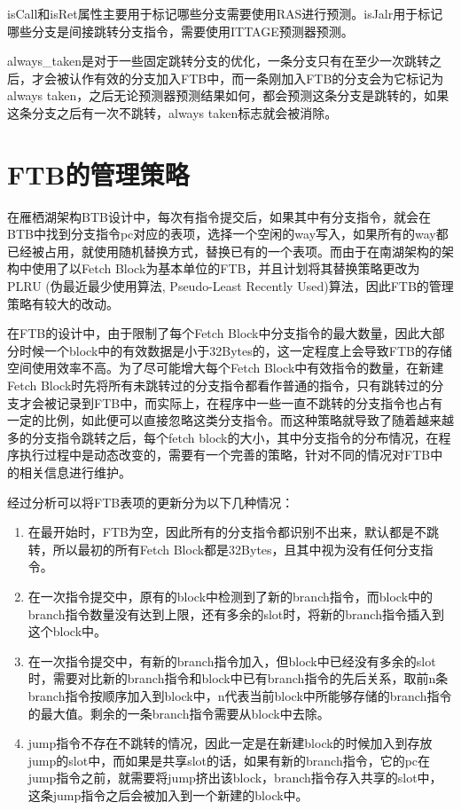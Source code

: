 isCall和isRet属性主要用于标记哪些分支需要使用RAS进行预测。isJalr用于标记哪些分支是间接跳转分支指令，需要使用ITTAGE预测器预测。

always\_taken是对于一些固定跳转分支的优化，一条分支只有在至少一次跳转之后，才会被认作有效的分支加入FTB中，而一条刚加入FTB的分支会为它标记为always taken，之后无论预测器预测结果如何，都会预测这条分支是跳转的，如果这条分支之后有一次不跳转，always taken标志就会被消除。

\section{FTB的管理策略}

在雁栖湖架构BTB设计中，每次有指令提交后，如果其中有分支指令，就会在BTB中找到分支指令pc对应的表项，选择一个空闲的way写入，如果所有的way都已经被占用，就使用随机替换方式，替换已有的一个表项。而由于在南湖架构的架构中使用了以Fetch Block为基本单位的FTB，并且计划将其替换策略更改为PLRU (伪最近最少使用算法, Pseudo-Least Recently Used)算法，因此FTB的管理策略有较大的改动。

在FTB的设计中，由于限制了每个Fetch Block中分支指令的最大数量，因此大部分时候一个block中的有效数据是小于32Bytes的，这一定程度上会导致FTB的存储空间使用效率不高。为了尽可能增大每个Fetch Block中有效指令的数量，在新建Fetch Block时先将所有未跳转过的分支指令都看作普通的指令，只有跳转过的分支才会被记录到FTB中，而实际上，在程序中一些一直不跳转的分支指令也占有一定的比例，如此便可以直接忽略这类分支指令。而这种策略就导致了随着越来越多的分支指令跳转之后，每个fetch block的大小，其中分支指令的分布情况，在程序执行过程中是动态改变的，需要有一个完善的策略，针对不同的情况对FTB中的相关信息进行维护。

经过分析可以将FTB表项的更新分为以下几种情况：

\begin{enumerate}
	\item 在最开始时，FTB为空，因此所有的分支指令都识别不出来，默认都是不跳转，所以最初的所有Fetch Block都是32Bytes，且其中视为没有任何分支指令。
	\item 在一次指令提交中，原有的block中检测到了新的branch指令，而block中的branch指令数量没有达到上限，还有多余的slot时，将新的branch指令插入到这个block中。
	\item 在一次指令提交中，有新的branch指令加入，但block中已经没有多余的slot时，需要对比新的branch指令和block中已有branch指令的先后关系，取前n条branch指令按顺序加入到block中，n代表当前block中所能够存储的branch指令的最大值。剩余的一条branch指令需要从block中去除。
	\item jump指令不存在不跳转的情况，因此一定是在新建block的时候加入到存放jump的slot中，而如果是共享slot的话，如果有新的branch指令，它的pc在jump指令之前，就需要将jump挤出该block，branch指令存入共享的slot中，这条jump指令之后会被加入到一个新建的block中。
\end{enumerate}

